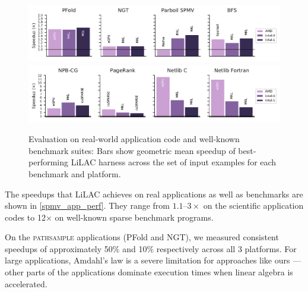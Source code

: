 \begin{figure}[t]
  \centering
  \includegraphics[width=2.1\columnwidth,height=0.5\columnwidth]{figures/baseline.pdf}
  \includegraphics[width=2.1\columnwidth,height=0.5\columnwidth]{figures/baseline_bench.pdf}
\\[-0.75em]
  \caption{Evaluation on real-world application code and well-known benchmark
          suites:
           Bars show geometric mean speedup of best-performing LiLAC harness across the
           set of input examples for each benchmark and platform. }
  \label{spmv_app_perf}
\end{figure}

The speedups that LiLAC achieves on real applications as well as benchmarks are
shown in \autoref{spmv_app_perf}.
They range from $1.1$--$3\times$ on the scientific application codes to
12$\times$ on well-known sparse benchmark programs.

On the \textsc{pathsample} applications (PFold and NGT), we measured
consistent speedups of approximately 50$\%$ and 10$\%$ respectively across
all 3 platforms.
For large applications, Amdahl's law is a severe limitation for
approaches like ours --- other parts of the applications dominate execution
times when linear algebra is accelerated.

